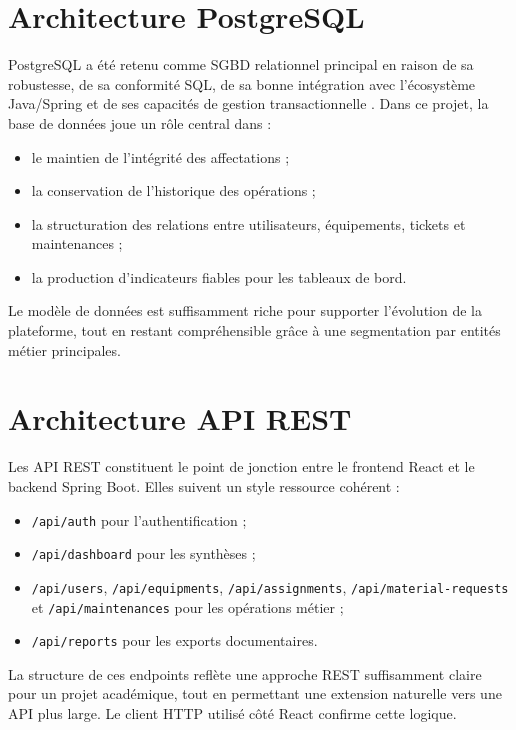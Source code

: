 \section{Architecture PostgreSQL}
PostgreSQL a été retenu comme SGBD relationnel principal en raison de sa robustesse, de sa conformité SQL, de sa bonne intégration avec l'écosystème Java/Spring et de ses capacités de gestion transactionnelle \cite{postgresdocs}. Dans ce projet, la base de données joue un rôle central dans :
\begin{itemize}
  \item le maintien de l'intégrité des affectations ;
  \item la conservation de l'historique des opérations ;
  \item la structuration des relations entre utilisateurs, équipements, tickets et maintenances ;
  \item la production d'indicateurs fiables pour les tableaux de bord.
\end{itemize}

Le modèle de données est suffisamment riche pour supporter l'évolution de la plateforme, tout en restant compréhensible grâce à une segmentation par entités métier principales.

\section{Architecture API REST}
Les API REST constituent le point de jonction entre le frontend React et le backend Spring Boot. Elles suivent un style ressource cohérent :
\begin{itemize}
  \item \texttt{/api/auth} pour l'authentification ;
  \item \texttt{/api/dashboard} pour les synthèses ;
  \item \texttt{/api/users}, \texttt{/api/equipments}, \texttt{/api/assignments}, \texttt{/api/material-requests} et \texttt{/api/maintenances} pour les opérations métier ;
  \item \texttt{/api/reports} pour les exports documentaires.
\end{itemize}

La structure de ces endpoints reflète une approche REST suffisamment claire pour un projet académique, tout en permettant une extension naturelle vers une API plus large. Le client HTTP utilisé côté React confirme cette logique.

\begin{codeblock}[H]
\caption{Client HTTP Axios et propagation du jeton d'accès}

\end{codeblock}

